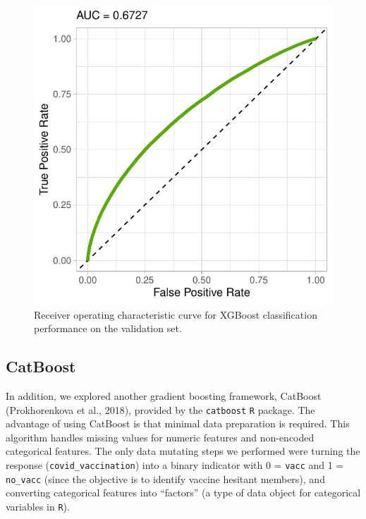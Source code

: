 \documentclass[
  12pt,
]{article}
\begin{document}
\begin{figure}[H]

{\centering \includegraphics{report_files/figure-latex/unnamed-chunk-6-1} 

}

\caption{Receiver operating characteristic curve for XGBoost classification performance on the validation set.}\label{fig:unnamed-chunk-6}
\end{figure}

\hypertarget{catboost}{%
\subsection{CatBoost}\label{catboost}}

In addition, we explored another gradient boosting framework, CatBoost
(Prokhorenkova et al., 2018), provided by the \texttt{catboost}
\texttt{R} package. The advantage of using CatBoost is that minimal data
preparation is required. This algorithm handles missing values for
numeric features and non-encoded categorical features. The only data
mutating steps we performed were turning the response
(\texttt{covid\_vaccination}) into a binary indicator with 0 =
\texttt{vacc} and 1 = \texttt{no\_vacc} (since the objective is to
identify vaccine hesitant members), and converting categorical features
into ``factors'' (a type of data object for categorical variables in
\texttt{R}).
\end{document}
